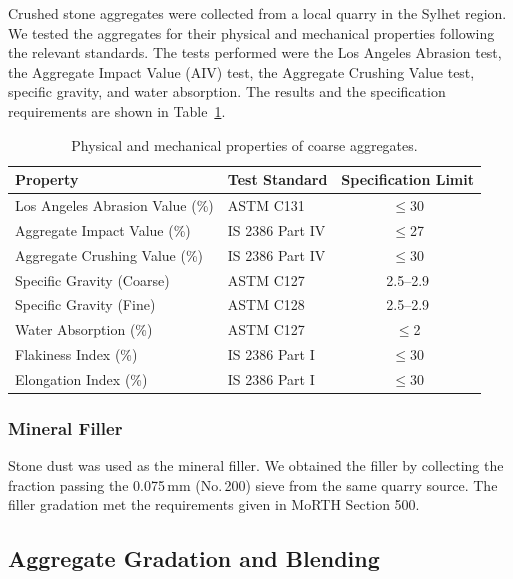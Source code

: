 \documentclass[12pt,a4paper]{article}
\begin{document}
Crushed stone aggregates were collected from a local quarry in the Sylhet region. We tested the aggregates for their physical and mechanical properties following the relevant standards. The tests performed were the Los Angeles Abrasion test, the Aggregate Impact Value (AIV) test, the Aggregate Crushing Value test, specific gravity, and water absorption. The results and the specification requirements are shown in Table~\ref{tab:agg_properties}.

\begin{table}[htbp]
    \centering
    \caption{Physical and mechanical properties of coarse aggregates.}
    \label{tab:agg_properties}
    \begin{tabular}{@{}llc@{}}
        \toprule
        \textbf{Property} & \textbf{Test Standard} & \textbf{Specification Limit} \\
        \midrule
        Los Angeles Abrasion Value (\%) & ASTM C131 & $\leq$30 \\
        Aggregate Impact Value (\%) & IS 2386 Part IV & $\leq$27 \\
        Aggregate Crushing Value (\%) & IS 2386 Part IV & $\leq$30 \\
        Specific Gravity (Coarse) & ASTM C127 & 2.5--2.9 \\
        Specific Gravity (Fine) & ASTM C128 & 2.5--2.9 \\
        Water Absorption (\%) & ASTM C127 & $\leq$2 \\
        Flakiness Index (\%) & IS 2386 Part I & $\leq$30 \\
        Elongation Index (\%) & IS 2386 Part I & $\leq$30 \\
        \bottomrule
    \end{tabular}
\end{table}

\subsubsection{Mineral Filler}

Stone dust was used as the mineral filler. We obtained the filler by collecting the fraction passing the 0.075\,mm (No.\,200) sieve from the same quarry source. The filler gradation met the requirements given in MoRTH Section 500.

\subsection{Aggregate Gradation and Blending}
\label{subsec:agg_gradation}
\end{document}

